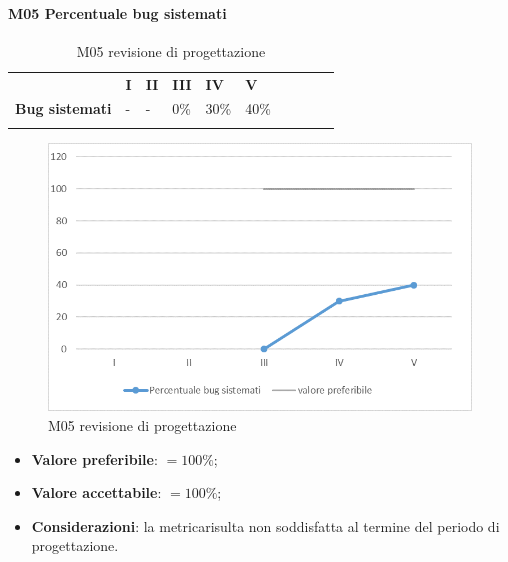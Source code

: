 \paragraph{M05 Percentuale bug sistemati} \mbox{}
\begin{longtable}[H!] {						
		>{}p{50mm}  		
		>{}p{8mm}
		>{}p{8mm}		
		>{}p{8mm}		
		>{}p{8mm}		
		>{}p{8mm}		
		>{}p{8mm}
		>{}p{8mm}
		>{}p{8mm}
		>{}p{8mm}
	}
	\rowcolor{gray!50}
	\textbf{} & \textbf{I} & \textbf{II} & \textbf{III} & \textbf{IV} & \textbf{V} \TBstrut \\ [2mm]
	\textbf{Bug sistemati} & - & - & 0\% & 30\% & 40\% \TBstrut \\ [2mm]
	\rowcolor{white}
	\caption{M05 revisione di progettazione\glo}
\end{longtable}
\begin{figure}[H] 	
\includegraphics[width=\linewidth]{./img/grafici/RP16.png}	
\caption{M05 revisione di progettazione\glo}	
\end{figure}
\begin{itemize}
	\item \textbf{Valore preferibile}: $=100\%$;
	\item \textbf{Valore accettabile}: $=100\%$;
	\item \textbf{Considerazioni}: la metrica\glosp risulta non soddisfatta al termine del periodo di progettazione\glo.
\end{itemize}
